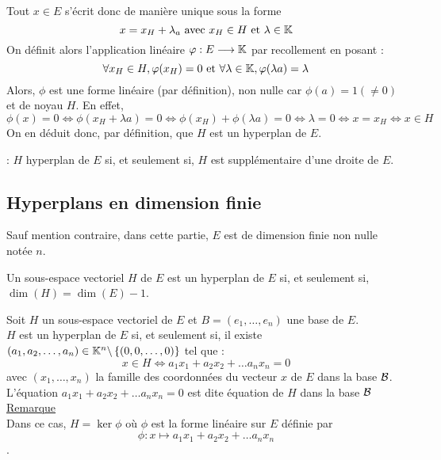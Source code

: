 \begin{dem}
\begin{itemize}
        Tout \(x \in  E\) s’écrit donc de manière unique sous la forme
        \[x = x_H + \lambda_a \text{ avec } x_H \in  H \text{ et }\lambda  \in  \K\]
        On définit alors l’application linéaire \(\phi : E \to \K\) par recollement en posant :
        \[\forall x_H \in  H, \phi(x_H ) = 0 \text{ et }\forall \lambda  \in  \K, \phi(\lambda a) = \lambda \]
        Alors, \(\phi\) est une forme linéaire (par définition), non nulle car \(\phi(a) = 1(\neq 0)\) et de noyau \(H\). En effet,
        \[\phi(x) = 0 \iff \phi(x_H + \lambda a) = 0 \iff \phi(x_H ) + \phi(\lambda a) = 0 \iff \lambda  = 0 \iff x = x_H \iff x \in  H\]
        On en déduit donc, par définition, que \(H\) est un hyperplan de \(E\).
    \end{itemize}
    \conclusion : \(H\) hyperplan de \(E\) si, et seulement si, \(H\) est supplémentaire d’une droite de \(E\).
\end{dem}

\subsection{Hyperplans en dimension finie}
    Sauf mention contraire, dans cette partie, \(E\) est de dimension finie non nulle notée \(n\).
\begin{defprop}
    Un sous-espace vectoriel \(H\) de \(E\) est un hyperplan de \(E\) si, et seulement si, \(\dim(H) = \dim(E) - 1\).
\end{defprop}

\begin{defprop}
    Soit \(H\) un sous-espace vectoriel de \(E\) et \(B = (e_1, \dots , e_n)\) une base de \(E\).\\
    \(H\) est un hyperplan de \(E\) si, et seulement si, il existe \((a_1, a_2, \dots , a_n) \in  \K^n \pd \accol{(0, 0, \dots , 0)}\) tel que :
        \[x \in  H \iff a_1x_1 + a_2x_2 + \dots a_nx_n = 0\]
    avec \((x_1, \dots , x_n)\) la famille des coordonnées du vecteur \(x\) de \(E\) dans la base \(\cal{B}\).\\
    L’équation \(a_1x_1 + a_2x_2 + \dots a_nx_n = 0\) est dite équation de \(H\) dans la base \(\cal{B}\)\\
    \underline{Remarque}\\
    Dans ce cas, \(H = \ker \phi\) où \(\phi\) est la forme linéaire sur \(E\) définie par
    \[\phi : x \mapsto a_1x_1 + a_2x_2 + \dots a_nx_n\].
\end{defprop}

